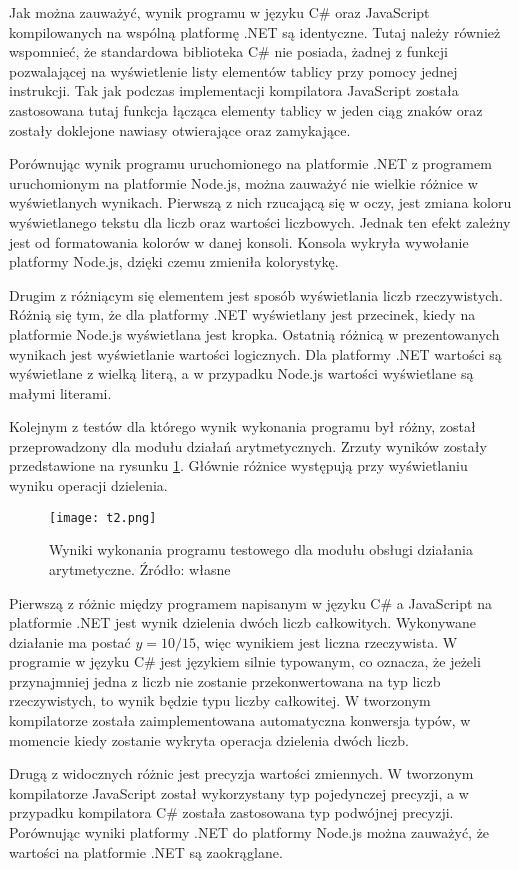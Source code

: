 \par Jak można zauważyć, wynik programu w języku C\# oraz JavaScript kompilowanych na wspólną platformę .NET są identyczne. Tutaj należy również wspomnieć, że standardowa biblioteka C\# nie posiada, żadnej z funkcji pozwalającej na wyświetlenie listy elementów tablicy przy pomocy jednej instrukcji. Tak jak podczas implementacji kompilatora JavaScript została zastosowana tutaj funkcja łącząca elementy tablicy w jeden ciąg znaków oraz zostały doklejone nawiasy otwierające oraz zamykające. 
\par Porównując wynik programu uruchomionego na platformie .NET z programem uruchomionym na platformie Node.js, można zauważyć nie wielkie różnice w wyświetlanych wynikach. Pierwszą z nich rzucającą się w oczy, jest zmiana koloru wyświetlanego tekstu dla liczb oraz wartości liczbowych. Jednak ten efekt zależny jest od formatowania kolorów w danej konsoli. Konsola wykryła wywołanie platformy Node.js, dzięki czemu zmieniła kolorystykę.
\par Drugim z różniącym się elementem jest sposób wyświetlania liczb rzeczywistych. Różnią się tym, że dla platformy .NET wyświetlany jest przecinek, kiedy na platformie Node.js wyświetlana jest kropka. Ostatnią różnicą w prezentowanych wynikach jest wyświetlanie wartości logicznych. Dla platformy .NET wartości są wyświetlane z wielką literą, a w przypadku Node.js wartości wyświetlane są małymi literami.

\par Kolejnym z testów dla którego wynik wykonania programu był różny, został przeprowadzony dla modułu działań arytmetycznych. Zrzuty wyników zostały przedstawione na rysunku \ref{fig:result2}. Głównie różnice występują przy wyświetlaniu wyniku operacji dzielenia.

\begin{figure}[!h]
	\centering
  \texttt{[image: t2.png]}
	\caption{Wyniki wykonania programu testowego dla modułu obsługi działania arytmetyczne. Źródło: własne}
	\label{fig:result2}
\end{figure}

\par Pierwszą z różnic między programem napisanym w języku C\# a JavaScript na platformie .NET jest wynik dzielenia dwóch liczb całkowitych. Wykonywane działanie ma postać $y = 10 / 15$, więc wynikiem jest liczna rzeczywista. W programie w języku C\# jest językiem silnie typowanym, co oznacza, że jeżeli przynajmniej jedna z liczb nie zostanie przekonwertowana na typ liczb rzeczywistych, to wynik będzie typu liczby całkowitej. W tworzonym kompilatorze została zaimplementowana automatyczna konwersja typów, w momencie kiedy zostanie wykryta operacja dzielenia dwóch liczb.
\par Drugą z widocznych różnic jest precyzja wartości zmiennych. W tworzonym kompilatorze JavaScript został wykorzystany typ pojedynczej precyzji, a w przypadku kompilatora C\# została zastosowana typ podwójnej precyzji. Porównując wyniki platformy .NET do platformy Node.js można zauważyć, że wartości na platformie .NET są zaokrąglane.


